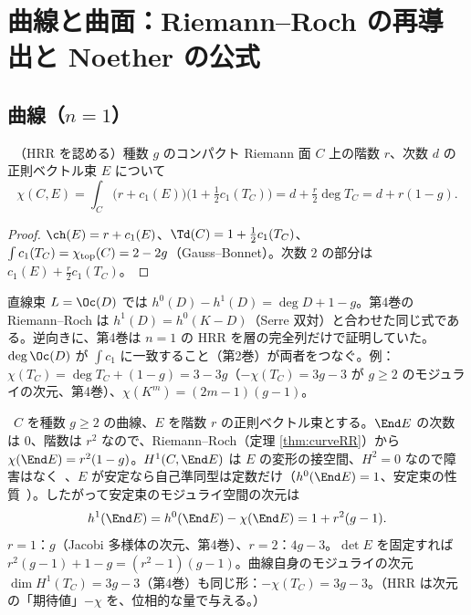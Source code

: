 \section{曲線と曲面：Riemann--Roch の再導出と Noether の公式}\label{sec:surf}
\subsection{曲線（$n=1$）}
\begin{thm}\label{thm:curveRR}\tP\ （HRR を認める）種数 $g$ のコンパクト Riemann 面 $C$ 上の階数 $r$、次数 $d$ の正則ベクトル束 $E$ について
\[
\chi(C,E)=\int_C\bigl(r+c_1(E)\bigr)\bigl(1+\tfrac12c_1(T_C)\bigr)=d+\tfrac r2\deg T_C=d+r(1-g).
\]
\end{thm}
\begin{proof}
$\ch(E)=r+c_1(E)$、$\Td(C)=1+\frac12c_1(T_C)$、$\int c_1(T_C)=\chi_{\rm top}(C)=2-2g$（Gauss--Bonnet）。次数 $2$ の部分は $c_1(E)+\frac r2c_1(T_C)$。
\end{proof}
\noindent 直線束 $L=\Oc(D)$ では $h^0(D)-h^1(D)=\deg D+1-g$。第4巻の Riemann--Roch は $h^1(D)=h^0(K-D)$（Serre 双対）と合わせた同じ式である。逆向きに、第4巻は $n=1$ の HRR を層の完全列だけで証明していた。$\deg\Oc(D)$ が $\int c_1$ に一致すること（第2巻）が両者をつなぐ。例：$\chi(T_C)=\deg T_C+(1-g)=3-3g$（$-\chi(T_C)=3g-3$ が $g\ge2$ のモジュライの次元、第4巻）、$\chi(K^m)=(2m-1)(g-1)$。


\begin{ex}[曲線上のベクトル束のモジュライの次元]\label{ex:modbundle}\tP\
$C$ を種数 $g\ge2$ の曲線、$E$ を階数 $r$ の正則ベクトル束とする。$\End E$ の次数は $0$、階数は $r^2$ なので、Riemann--Roch（定理 \ref{thm:curveRR}）から $\chi(\End E)=r^2(1-g)$。$H^1(C,\End E)$ は $E$ の変形の接空間、$H^2=0$ なので障害はなく\tC\ 、$E$ が安定なら自己準同型は定数だけ（$h^0(\End E)=1$、安定束の性質\tC\ ）。したがって安定束のモジュライ空間の次元は
\[
h^1(\End E)=h^0(\End E)-\chi(\End E)=1+r^2(g-1).
\]
$r=1$：$g$（Jacobi 多様体の次元、第4巻）、$r=2$：$4g-3$。$\det E$ を固定すれば $r^2(g-1)+1-g=(r^2-1)(g-1)$。曲線自身のモジュライの次元 $\dim H^1(T_C)=3g-3$（第4巻）も同じ形：$-\chi(T_C)=3g-3$。（HRR は次元の「期待値」$-\chi$ を、位相的な量で与える。）
\end{ex}
